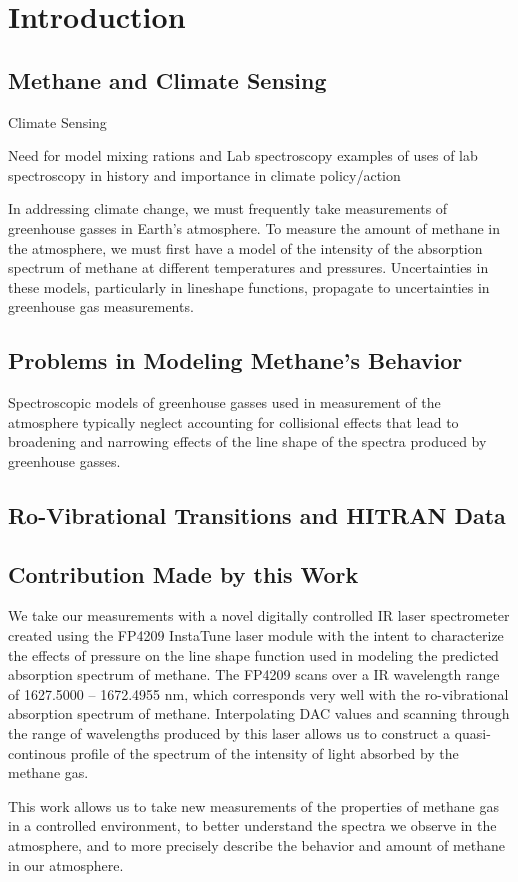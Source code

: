 \documentclass[../main]{subfiles}
\begin{document}
\chapter*{Introduction}
\section*{Methane and Climate Sensing}
Climate Sensing 
    




Need for model
    mixing rations and Lab spectroscopy
        examples of uses of lab spectroscopy in history and importance in climate policy/action




In addressing climate change, we must frequently take measurements of greenhouse gasses in Earth’s atmosphere. 
To measure the amount of methane in the atmosphere, we must first have a model of the intensity of the absorption spectrum of 
methane at different temperatures and pressures. Uncertainties in these models, particularly in lineshape functions, 
propagate to uncertainties in greenhouse gas measurements. 
\section*{Problems in Modeling Methane's Behavior}
Spectroscopic models of greenhouse gasses used in measurement of the atmosphere typically neglect 
accounting for collisional effects that lead to broadening and narrowing effects of the line shape of the spectra 
produced by greenhouse gasses. 
\section*{Ro-Vibrational Transitions and HITRAN Data}




\section*{Contribution Made by this Work}
We take our measurements with a novel digitally controlled IR laser spectrometer created using the FP4209 InstaTune laser module 
with the intent to characterize the effects of pressure on the line shape function used in modeling the predicted absorption spectrum of methane. 
The FP4209 scans over a IR wavelength range of 1627.5000 – 1672.4955 nm, which corresponds very well with the ro-vibrational absorption spectrum of methane. 
Interpolating DAC values and scanning through the range of wavelengths produced by this laser allows us to construct a quasi-continous profile of 
the spectrum of the intensity of light absorbed by the methane gas. 

This work allows us to take new measurements of the properties of methane gas in a controlled environment, 
to better understand the spectra we observe in the atmosphere, and to more precisely describe the behavior 
and amount of methane in our atmosphere. 
\end{document}
